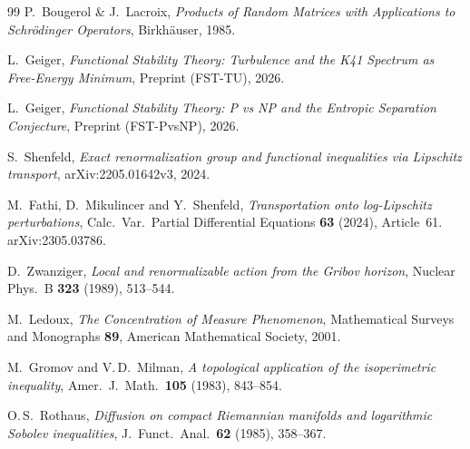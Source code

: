 \documentclass[12pt,a4paper]{article}
\theoremstyle{definition}
\theoremstyle{plain}
\theoremstyle{remark}
\begin{document}
\begin{thebibliography}{99}
P.~Bougerol \& J.~Lacroix, \emph{Products of Random Matrices with Applications to Schr\"odinger Operators}, Birkh\"auser, 1985.

L.~Geiger, \emph{Functional Stability Theory: Turbulence and the K41 Spectrum as Free-Energy Minimum}, Preprint (FST-TU), 2026.

L.~Geiger, \emph{Functional Stability Theory: P vs NP and the Entropic Separation Conjecture}, Preprint (FST-PvsNP), 2026.

S.~Shenfeld, \emph{Exact renormalization group and functional inequalities via Lipschitz transport}, arXiv:2205.01642v3, 2024.

M.~Fathi, D.~Mikulincer and Y.~Shenfeld, \emph{Transportation onto log-Lipschitz perturbations}, Calc.\ Var.\ Partial Differential Equations \textbf{63} (2024), Article~61. arXiv:2305.03786.

D.~Zwanziger, \emph{Local and renormalizable action from the Gribov horizon}, Nuclear Phys.\ B \textbf{323} (1989), 513--544.

M.~Ledoux, \emph{The Concentration of Measure Phenomenon}, Mathematical Surveys and Monographs \textbf{89}, American Mathematical Society, 2001.

M.~Gromov and V.\,D.~Milman, \emph{A topological application of the isoperimetric inequality}, Amer.\ J.\ Math.\ \textbf{105} (1983), 843--854.

O.\,S.~Rothaus, \emph{Diffusion on compact Riemannian manifolds and logarithmic Sobolev inequalities}, J.~Funct.\ Anal.\ \textbf{62} (1985), 358--367.

\end{thebibliography}
\end{document}
